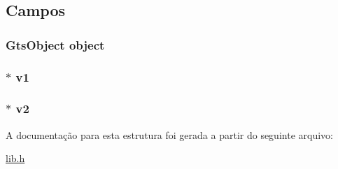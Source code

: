 \subsection{Campos}
\subsubsection[{\texorpdfstring{object}{object}}]{\setlength{\rightskip}{0pt plus 5cm}Gts\+Object object}\hypertarget{structdbSegment_a4c9ad028a3c5d740f1fc0b15669c1c0f}{}\label{structdbSegment_a4c9ad028a3c5d740f1fc0b15669c1c0f}
\subsubsection[{\texorpdfstring{v1}{v1}}]{$\ast$ v1}\hypertarget{structdbSegment_ac54d355714c397af2824dfa3743b0059}{}\label{structdbSegment_ac54d355714c397af2824dfa3743b0059}
\subsubsection[{\texorpdfstring{v2}{v2}}]{$\ast$ v2}\hypertarget{structdbSegment_a63dc8509dabff387725bbdc284734f6a}{}\label{structdbSegment_a63dc8509dabff387725bbdc284734f6a}


A documentação para esta estrutura foi gerada a partir do seguinte arquivo\+:\begin{DoxyCompactItemize}
\item 
\hyperlink{lib_8h}{lib.\+h}\end{DoxyCompactItemize}
